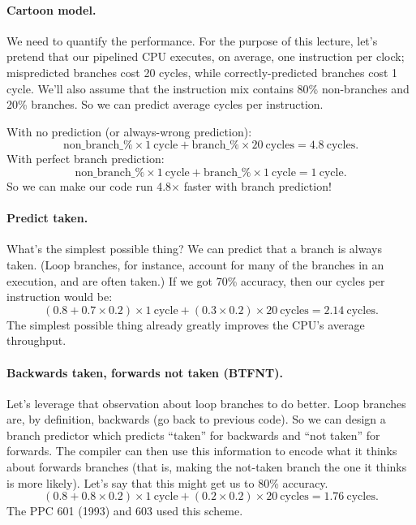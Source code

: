 \paragraph{Cartoon model.} We need to quantify the performance.
For the purpose of this lecture, let's pretend that our pipelined
CPU executes, on average, one instruction per clock;
mispredicted branches cost 20 cycles, while correctly-predicted
branches cost 1 cycle. We'll also assume that the instruction
mix contains 80\% non-branches and 20\% branches. So we can predict
average cycles per instruction.

With no prediction (or always-wrong prediction):
\[
\mathrm{non\_branch\_\%} \times 1 \mathrm{~cycle} + \mathrm{branch\_\%} \times 20 \mathrm{~cycles} = 4.8 \mathrm{~cycles}.
\]
With perfect branch prediction:
\[
\mathrm{non\_branch\_\%} \times 1 \mathrm{~cycle} + \mathrm{branch\_\%} \times 1 \mathrm{~cycle} = 1 \mathrm{~cycle}.
\]
So we can make our code run 4.8$\times$ faster with branch prediction!

\paragraph{Predict taken.} What's the simplest possible thing? We can
predict that a branch is always taken. (Loop branches, for instance,
account for many of the branches in an execution, and are often taken.)
If we got 70\% accuracy, then our cycles per instruction would be:
\[
(0.8 + 0.7 \times 0.2) \times 1 \mathrm{~cycle} + (0.3 \times 0.2) \times 20 \mathrm{~cycles} = 2.14 \mathrm{~cycles}.
\]
The simplest possible thing already greatly improves the CPU's average throughput.

\paragraph{Backwards taken, forwards not taken (BTFNT).}
Let's leverage that observation about loop branches to do better.
Loop branches are, by definition, backwards (go back to previous
code). So we can design a branch predictor which predicts ``taken''
for backwards and ``not taken'' for forwards. The compiler can then
use this information to encode what it thinks about forwards branches
(that is, making the not-taken branch the one it thinks is more likely).
Let's say that this might get us to 80\% accuracy. \[
(0.8 + 0.8 \times 0.2) \times 1 \mathrm{~cycle} + (0.2 \times 0.2) \times 20 \mathrm{~cycles} = 1.76 \mathrm{~cycles}.
\]
The PPC 601 (1993) and 603 used this scheme.

